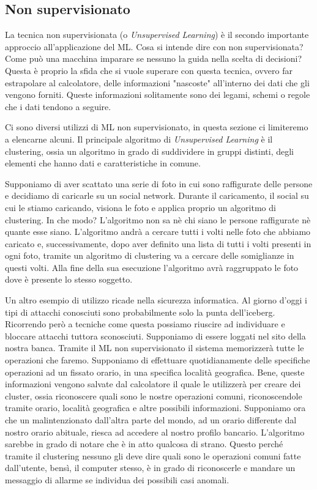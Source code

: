 \documentclass[12pt,italian]{report}
\begin{document}
\subsection{Non supervisionato}
La tecnica non supervisionata (o \emph{Unsupervised Learning}) è il secondo importante approccio all'applicazione del ML. Cosa si intende dire con non supervisionata? Come può una macchina imparare se nessuno la guida nella scelta di decisioni?
Questa è proprio la sfida che si vuole superare con questa tecnica, ovvero far estrapolare al calcolatore, delle informazioni "nascoste" all'interno dei dati che gli vengono forniti. Queste informazioni solitamente sono dei legami, schemi o regole che i dati tendono a seguire.

Ci sono diversi utilizzi di ML non supervisionato, in questa sezione ci limiteremo a elencarne alcuni. Il principale algoritmo di \emph{Unsupervised Learning} è il clustering, ossia un algoritmo in grado di suddividere in gruppi distinti, degli elementi che hanno dati e caratteristiche in comune.

Supponiamo di aver scattato una serie di foto in cui sono raffigurate delle persone e decidiamo di caricarle su un social network. Durante il caricamento, il social su cui le stiamo caricando, visiona le foto e applica proprio un algoritmo di clustering. In che modo? L'algoritmo non sa nè chi siano le persone raffigurate nè quante esse siano. L'algoritmo andrà a cercare tutti i volti nelle foto che abbiamo caricato e, successivamente, dopo aver definito una lista di tutti i volti presenti in ogni foto, tramite un algoritmo di clustering va a cercare delle somiglianze in questi volti. Alla fine della sua esecuzione l'algoritmo avrà raggruppato le foto dove è presente lo stesso soggetto.

Un altro esempio di utilizzo ricade nella sicurezza informatica. Al giorno d'oggi i tipi di attacchi conosciuti sono probabilmente solo la punta dell'iceberg. Ricorrendo però a tecniche come questa possiamo riuscire ad individuare e bloccare attacchi tuttora sconosciuti. 
Supponiamo di essere loggati nel sito della nostra banca. Tramite il ML non supervisionato il sistema memorizzerà tutte le operazioni che faremo. Supponiamo di effettuare quotidianamente delle specifiche operazioni ad un fissato orario, in una specifica località geografica. Bene, queste informazioni vengono salvate dal calcolatore il quale le utilizzerà per creare dei cluster, ossia riconoscere quali sono le nostre operazioni comuni, riconoscendole tramite orario, località geografica e altre possibili informazioni. Supponiamo ora che un malintenzionato dall'altra parte del mondo, ad un orario differente dal nostro orario abituale, riesca ad accedere al nostro profilo bancario. L'algoritmo sarebbe in grado di notare che è in atto qualcosa di strano. Questo perché tramite il clustering nessuno gli deve dire quali sono le operazioni comuni fatte dall'utente, bensì, il computer stesso, è in grado di riconoscerle e mandare un messaggio di allarme se individua dei possibili casi anomali. 
\end{document}
